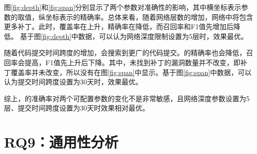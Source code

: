 图\ref{fig:depth}和\ref{fig:span}分别显示了两个参数对\tool 准确性的影响，其中横坐标表示参数的取值，纵坐标表示\tool 的精确率。总体来看，随着网络层数的增加，网络中将包含更多补丁。此时，\tool 覆盖率在上升，精确率在降低，而召回率和F1值先增加后降低。
基于图\ref{fig:depth}中数据，可以认为网络深度限制设置为5层时，\tool 效果最优。

随着代码提交时间跨度的增加，\tool 会搜索到更广的代码提交。\tool 的精确率也会降低，召回率会提高，F1值先上升后下降。其中，\tool 未找到补丁的漏洞数量并不改变，即补丁覆盖率并未改变，所以没有在图\ref{fig:span}中显示。基于图\ref{fig:span}中数据，可以认为提交时间跨度设置为30天时，\tool 效果最优。

综上，\tool 的准确率对两个可配置参数的变化不是非常敏感，且网络深度参数设置为5层、提交时间跨度设置为30天时效果相对最优。

\section{RQ9：通用性分析}\label{sec:generality}


